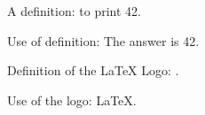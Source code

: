 
A definition:  to print {\mktsStyleCode{}42}.\mktsShowpar\par
Use of definition: The answer is {\mktsStyleBold{}42}.\mktsShowpar\par
Definition of the LaTeX Logo:
.\mktsShowpar\par
Use of the logo: \LaTeX{}.\mktsShowpar\par

